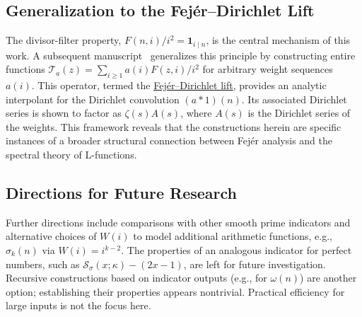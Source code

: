 \subsection{Generalization to the Fej\'er--Dirichlet Lift}
The divisor-filter property, $F(n,i)/i^2 = \mathbf{1}_{i\mid n}$, is the central mechanism of this work. A subsequent manuscript~\cite{fuchs2025-fejer} generalizes this principle by constructing entire functions $\mathcal{T}_a(z) = \sum_{i\ge1} a(i) F(z,i)/i^2$ for arbitrary weight sequences $a(i)$. This operator, termed the \href{https://arxiv.org/abs/2509.12297}{Fej\'er--Dirichlet lift}, provides an analytic interpolant for the Dirichlet convolution $(a*1)(n)$. Its associated Dirichlet series is shown to factor as $\zeta(s)A(s)$, where $A(s)$ is the Dirichlet series of the weights. This framework reveals that the constructions herein are specific instances of a broader structural connection between Fejér analysis and the spectral theory of L-functions.

\subsection{Directions for Future Research}
Further directions include comparisons with other smooth prime indicators and alternative choices of $W(i)$ to model additional arithmetic functions, e.g., $\sigma_k(n)$ via $W(i)=i^{k-2}$. The properties of an analogous indicator for perfect numbers, such as $\mathcal{S}_\sigma(x;\kappa)-(2x-1)$, are left for future investigation. Recursive constructions based on indicator outputs (e.g., for $\omega(n)$) are another option; establishing their properties appears nontrivial. Practical efficiency for large inputs is not the focus here.

